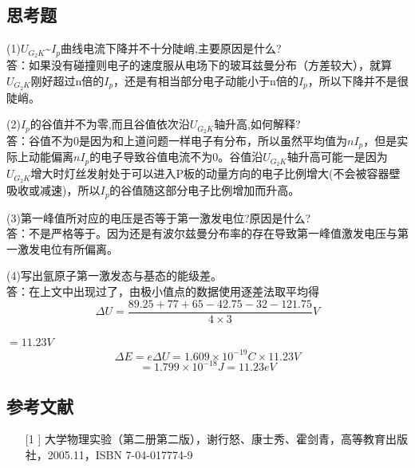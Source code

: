 \documentclass[UEF8]{ctexart}
\begin{document}
\begin{multicols}{2}
\subsection{思考题}
(1)$U_{G_{2}K}$\~{}$I_{p}$曲线电流下降并不十分陡峭,主要原因是什么?\\
答：如果没有碰撞则电子的速度服从电场下的玻耳兹曼分布（方差较大），就算$U_{G_{2}K}$刚好超过n倍的$I_{p}$，还是有相当部分电子动能小于n倍的$I_{p}$，所以下降并不是很陡峭。

(2)$I_{p}$的谷值并不为零,而且谷值依次沿$U_{G_{2}K}$轴升高,如何解释?\\
答：谷值不为0是因为和上道问题一样电子有分布，所以虽然平均值为$nI_{p}$，但是实际上动能偏离$nI_{p}$的电子导致谷值电流不为0。谷值沿$U_{G_{2}K}$轴升高可能一是因为$U_{G_{2}K}$增大时灯丝发射处于可以进入P板的动量方向的电子比例增大(不会被容器壁吸收或减速)，所以$I_{p}$的谷值随这部分电子比例增加而升高。

(3)第一峰值所对应的电压是否等于第一激发电位?原因是什么?\\
答：不是严格等于。因为还是有波尔兹曼分布率的存在导致第一峰值激发电压与第一激发电位有所偏离。

(4)写出氩原子第一激发态与基态的能级差。\\
答：在上文中出现过了，由极小值点的数据使用逐差法取平均得$$\Delta{U}=\dfrac{89.25+77+65-42.75-32-121.75}{4\times3}V$$

$=11.23V$
$$\Delta{E}=e\Delta{U}={1.609}\times{10^{-19}}C\times{11.23V}$$
$$=1.799\times10^{-18}J=11.23eV$$

\subsection{参考文献}
\begin{enumerate}
	\item[[1]] 大学物理实验（第二册第二版），谢行怒、康士秀、霍剑青，高等教育出版社，2005.11，ISBN 7-04-017774-9
\end{enumerate}


\end{multicols}
\end{document}
